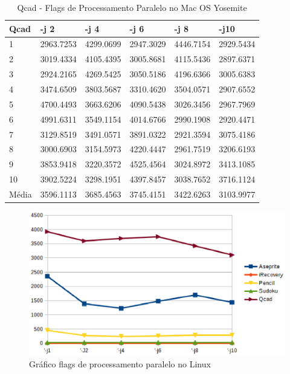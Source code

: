 \begin{table}[!ht]
\centering
\tiny
\caption{Qcad - Flags de Processamento Paralelo no Mac OS Yosemite}
\label{tab:flag_processamento_paralelo:mac:qcad}
\begin{tabular}{llllll}
\textbf{Qcad} & \textbf{-j 2} & \textbf{-j 4} & \textbf{-j 6} & \textbf{-j 8} & \textbf{-j10}  \\ \toprule
1            & 2963.7253  &  4299.0699 &   2947.3029 &   4446.7154 &   2929.5434  \\ 
2            & 3019.4334  &  4105.4395 &   3005.8681 &   4115.5436 &   2897.6371  \\ 
3            & 2924.2165  &  4269.5425 &   3050.5186 &   4196.6366 &   3005.6383  \\ 
4            & 3474.6509  &  3803.5687 &   3310.4620 &   3504.0571 &   2907.6552  \\ 
5            & 4700.4493  &  3663.6206 &   4090.5438 &   3026.3456 &   2967.7969  \\ 
6            & 4991.6311  &  3549.1154 &   4014.6766 &   2990.1908 &   2920.4471  \\ 
7            & 3129.8519  &  3491.0571 &   3891.0322 &   2921.3594 &   3075.4186  \\ 
8            & 3000.6903  &  3154.5973 &   4220.4447 &   2961.7519 &   3206.6193  \\ 
9            & 3853.9418  &  3220.3572 &   4525.4564 &   3024.8972 &   3413.1085  \\ 
10           & 3902.5224  &  3298.1951 &   4397.8457 &   3038.7652 &   3716.1124  \\ \bottomrule
Média        & 3596.1113  &  3685.4563 &   3745.4151 &   3422.6263 &   3103.9977  \\ 
\end{tabular}
\end{table}

        \begin{figure}[!h]
            \centering
                \includegraphics{figuras/graficos/linux_processamento_paralelo.eps}
            \caption{Gráfico flags de processamento paralelo no Linux}
            \label{flags_de_processamento_paralelo_linux}
        \end{figure}

